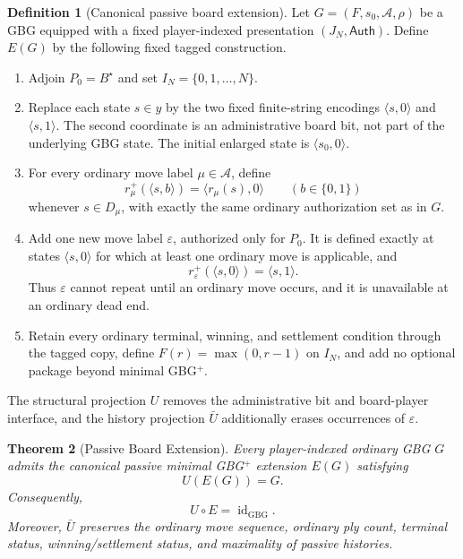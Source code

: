 \documentclass[11pt]{article}
\newtheorem{theorem}{Theorem}[section]
\theoremstyle{definition}
\newtheorem{definition}[theorem]{Definition}
\theoremstyle{remark}
\newcommand{\GBG}{\mathrm{GBG}}
\newcommand{\id}{\operatorname{id}}
\newcommand{\Board}{B^{\star}}
\begin{document}
\begin{definition}[Canonical passive board extension]
Let $G=(F,s_0,\mathcal A,\rho)$ be a GBG equipped with a fixed player-indexed presentation $(J_N,\mathsf{Auth})$.  Define $E(G)$ by the following fixed tagged construction.
\begin{enumerate}[label=(\roman*),leftmargin=1.7em]
\item Adjoin $P_0=\Board$ and set $I_N=\{0,1,\ldots,N\}$.
\item Replace each state $s\in y$ by the two fixed finite-string encodings $\langle s,0\rangle$ and $\langle s,1\rangle$.  The second coordinate is an administrative board bit, not part of the underlying GBG state.  The initial enlarged state is $\langle s_0,0\rangle$.
\item For every ordinary move label $\mu\in\mathcal A$, define
\[
r_\mu^{+}(\langle s,b\rangle)=\langle r_\mu(s),0\rangle\qquad(b\in\{0,1\})
\]
whenever $s\in D_\mu$, with exactly the same ordinary authorization set as in $G$.
\item Add one new move label $\varepsilon$, authorized only for $P_0$.  It is defined exactly at states $\langle s,0\rangle$ for which at least one ordinary move is applicable, and
\[
r_\varepsilon^{+}(\langle s,0\rangle)=\langle s,1\rangle.
\]
Thus $\varepsilon$ cannot repeat until an ordinary move occurs, and it is unavailable at an ordinary dead end.
\item Retain every ordinary terminal, winning, and settlement condition through the tagged copy, define $F(r)=\max(0,r-1)$ on $I_N$, and add no optional package beyond minimal GBG$^{+}$.
\end{enumerate}
The structural projection $U$ removes the administrative bit and board-player interface, and the history projection $\bar U$ additionally erases occurrences of $\varepsilon$.
\end{definition}

\begin{theorem}[Passive Board Extension]
Every player-indexed ordinary GBG $G$ admits the canonical passive minimal GBG$^{+}$ extension $E(G)$ satisfying
\[
\boxed{U(E(G))=G.}
\]
Consequently,
\[
\boxed{U\circ E=\id_{\GBG}.}
\]
Moreover, $\bar U$ preserves the ordinary move sequence, ordinary ply count, terminal status, winning/settlement status, and maximality of passive histories.
\end{theorem}
\end{document}
